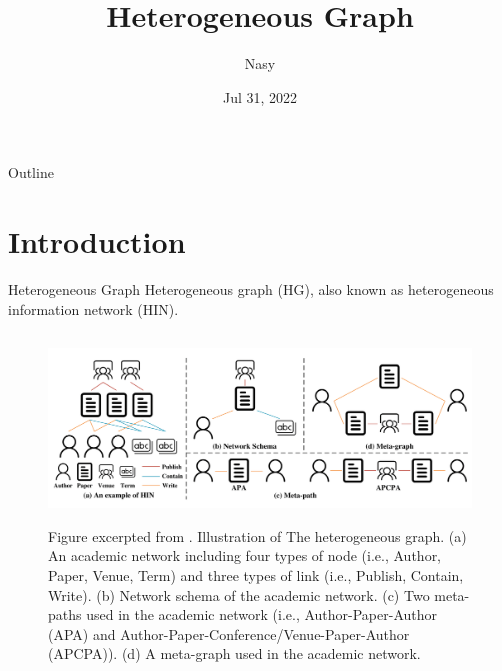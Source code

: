 \documentclass[aspectratio=1610,xcolor={dvipsnames},hyperref={colorlinks,unicode,linkcolor=violet,anchorcolor=blueviolet,citecolor=YellowOrange,filecolor=black,urlcolor=Aquamarine}]{beamer}
\author{Nasy}
\date{Jul 31, 2022}
\title{Heterogeneous Graph}
\begin{document}
\maketitle
\begin{frame}{Outline}
\tableofcontents
\end{frame}


\section{Introduction}
\label{sec:orgee44e42}

\begin{frame}[label={sec:org9017666}]{Heterogeneous Graph}
Heterogeneous graph (HG), also known as heterogeneous information network (HIN).

\begin{figure}[htbp]
\centering
\includegraphics[height=5cm]{./p1.png}
\caption{\label{fig:orgc37f77c}\tiny Figure excerpted from .  Illustration of The heterogeneous graph. (a) An academic network including four types of node (i.e., Author, Paper, Venue, Term) and three types of link (i.e., Publish, Contain, Write). (b) Network schema of the academic network. (c) Two meta-paths used in the academic network (i.e., Author-Paper-Author (APA) and Author-Paper-Conference/Venue-Paper-Author (APCPA)). (d) A meta-graph used in the academic network.}
\end{figure}
\end{frame}
\end{document}
